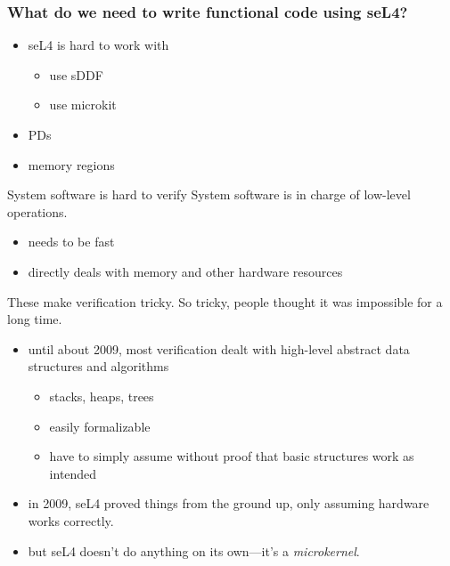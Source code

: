 \documentclass{beamer}
\begin{document}

\begin{frame}
    \frametitle{What do we need to write functional code using seL4?}
    \begin{itemize}
        \item seL4 is hard to work with
            \begin{itemize}
                \item use sDDF
                \item use microkit
            \end{itemize}
        \item PDs
        \item memory regions
    \end{itemize}
\end{frame}




\begin{frame}{System software is hard to verify}
    System software is in charge of low-level operations.
    \begin{itemize}
        \item needs to be fast
        \item directly deals with memory and other hardware resources
    \end{itemize}
    These make verification tricky.
    So tricky, people thought it was impossible for a long time.
    \begin{itemize}
        \item until about 2009, most verification dealt with high-level abstract data structures and algorithms
        \begin{itemize}
            \item stacks, heaps, trees
            \item easily formalizable
            \item have to simply assume without proof that basic structures work as intended
        \end{itemize}
        \item in 2009, seL4 proved things from the ground up, only assuming hardware works correctly.
        \item but seL4 doesn't do anything on its own---it's a \textit{microkernel}.
    \end{itemize}
\end{frame}
\end{document}
